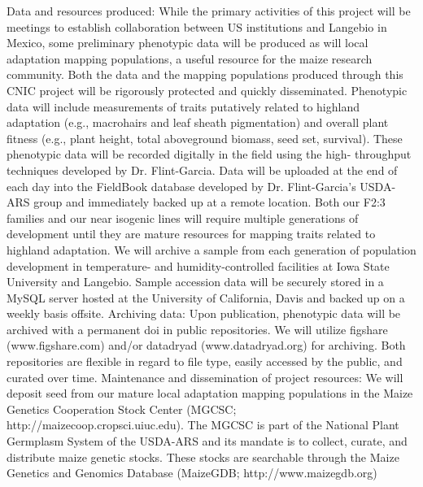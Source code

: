 Data and resources produced:
While the primary activities of this project will be meetings to establish collaboration between US institutions and Langebio in Mexico, some preliminary phenotypic data will be produced as will local adaptation mapping populations, a useful resource for the maize research community. Both the data and the mapping populations produced through this CNIC project will be rigorously protected and quickly disseminated.
Phenotypic data will include measurements of traits putatively related to highland adaptation (e.g., macrohairs and leaf sheath pigmentation) and overall plant fitness (e.g., plant height, total aboveground biomass, seed set, survival). These phenotypic data will be recorded digitally in the field using the high- throughput techniques developed by Dr. Flint-Garcia. Data will be uploaded at the end of each day into the FieldBook database developed by Dr. Flint-Garcia’s USDA-ARS group and immediately backed up at a remote location.
Both our F2:3 families and our near isogenic lines will require multiple generations of development until they are mature resources for mapping traits related to highland adaptation. We will archive a sample from each generation of population development in temperature- and humidity-controlled facilities at Iowa State University and Langebio. Sample accession data will be securely stored in a MySQL server hosted at the University of California, Davis and backed up on a weekly basis offsite.
Archiving data:
Upon publication, phenotypic data will be archived with a permanent doi in public repositories. We will utilize figshare (www.figshare.com) and/or datadryad (www.datadryad.org) for archiving. Both repositories are flexible in regard to file type, easily accessed by the public, and curated over time.
Maintenance and dissemination of project resources:
We will deposit seed from our mature local adaptation mapping populations in the Maize Genetics Cooperation Stock Center
(MGCSC; http://maizecoop.cropsci.uiuc.edu). The MGCSC is part of the National Plant Germplasm System of the USDA-ARS and its mandate is to collect, curate, and distribute maize genetic stocks. These stocks are searchable through the Maize Genetics and Genomics Database
(MaizeGDB; http://www.maizegdb.org)